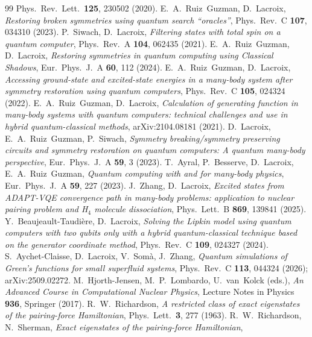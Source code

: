 \documentclass[
  aps,            %
  prc,            %
  reprint,        %
  superscriptaddress,
  floatfix,
  nofootinbib
]{revtex4-2}
\begin{document}
\begin{thebibliography}{99}
Phys.\ Rev.\ Lett.\ \textbf{125}, 230502 (2020).
E.~A.~Ruiz~Guzman, D.~Lacroix,
\textit{Restoring broken symmetries using quantum search ``oracles''},
Phys.\ Rev.\ C \textbf{107}, 034310 (2023).
P.~Siwach, D.~Lacroix,
\textit{Filtering states with total spin on a quantum computer},
Phys.\ Rev.\ A \textbf{104}, 062435 (2021).
E.~A.~Ruiz~Guzman, D.~Lacroix,
\textit{Restoring symmetries in quantum computing using Classical Shadows},
Eur.\ Phys.\ J.\ A \textbf{60}, 112 (2024).
E.~A.~Ruiz~Guzman, D.~Lacroix,
\textit{Accessing ground-state and excited-state energies in a many-body system after symmetry restoration using quantum computers},
Phys.\ Rev.\ C \textbf{105}, 024324 (2022).
E.~A.~Ruiz~Guzman, D.~Lacroix,
\textit{Calculation of generating function in many-body systems with quantum computers: technical challenges and use in hybrid quantum-classical methods},
arXiv:2104.08181 (2021).
D.~Lacroix, E.~A.~Ruiz~Guzman, P.~Siwach,
\textit{Symmetry breaking/symmetry preserving circuits and symmetry restoration on quantum computers: A quantum many-body perspective},
Eur.\ Phys.\ J.\ A \textbf{59}, 3 (2023).
T.~Ayral, P.~Besserve, D.~Lacroix, E.~A.~Ruiz~Guzman,
\textit{Quantum computing with and for many-body physics},
Eur.\ Phys.\ J.\ A \textbf{59}, 227 (2023).
J.~Zhang, D.~Lacroix,
\textit{Excited states from ADAPT-VQE convergence path in many-body problems: application to nuclear pairing problem and H$_4$ molecule dissociation},
Phys.\ Lett.\ B \textbf{869}, 139841 (2025).
Y.~Beaujeault-Taudi\`ere, D.~Lacroix,
\textit{Solving the Lipkin model using quantum computers with two qubits only with a hybrid quantum-classical technique based on the generator coordinate method},
Phys.\ Rev.\ C \textbf{109}, 024327 (2024).
S.~Aychet-Claisse, D.~Lacroix, V.~Som\`a, J.~Zhang,
\textit{Quantum simulations of Green's functions for small superfluid systems},
Phys.\ Rev.\ C \textbf{113}, 044324 (2026); arXiv:2509.02272.
M.~Hjorth-Jensen, M.~P.~Lombardo, U.~van~Kolck (eds.),
\textit{An Advanced Course in Computational Nuclear Physics},
Lecture Notes in Physics \textbf{936}, Springer (2017).
R.~W.~Richardson,
\textit{A restricted class of exact eigenstates of the pairing-force Hamiltonian},
Phys.\ Lett.\ \textbf{3}, 277 (1963).
R.~W.~Richardson, N.~Sherman,
\textit{Exact eigenstates of the pairing-force Hamiltonian},

\end{thebibliography}
\end{document}
